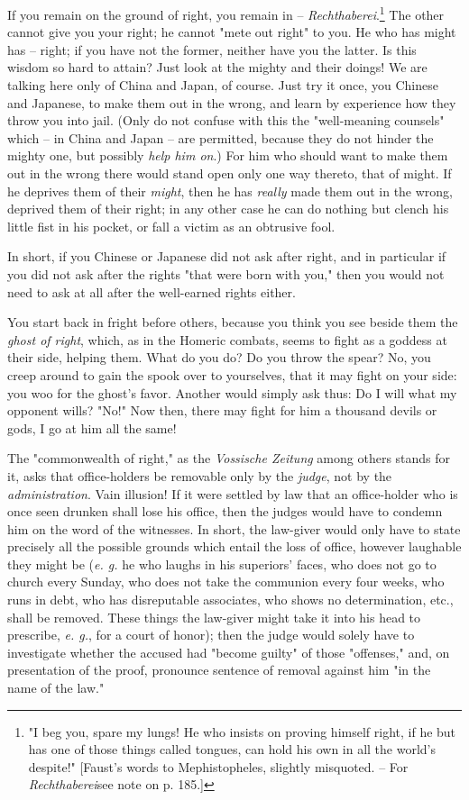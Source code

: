 \documentclass[a4paper]{book}
\begin{document}
If you remain on the ground of right, you remain in -- 
\textit{Rechthaberei}.\footnote{"{}I beg you, spare my lungs! He who insists 
on proving himself right, if he but has one of those things called tongues, 
can hold his own in all the world's despite!"{} [Faust's words to 
Mephistopheles, slightly misquoted. -- For \textit{Rechthaberei}see note on p. 
185.]} The other cannot give you your right; he cannot "{}mete out right"{} to 
you. He who has might has -- right; if you have not the former, neither have 
you the latter. Is this wisdom so hard to attain? Just look at the mighty and 
their doings! We are talking here only of China and Japan, of course. Just try 
it once, you Chinese and Japanese, to make them out in the wrong, and learn by 
experience how they throw you into jail. (Only do not confuse with this the 
"{}well-meaning counsels"{} which -- in China and Japan -- are permitted, 
because they do not hinder the mighty one, but possibly \textit{help him on}.) 
For him who should want to make them out in the wrong there would stand open 
only one way thereto, that of might. If he deprives them of their 
\textit{might}, then he has \textit{really} made them out in the wrong, 
deprived them of their right; in any other case he can do nothing but clench 
his little fist in his pocket, or fall a victim as an obtrusive fool.

In short, if you Chinese or Japanese did not ask after right, and in 
particular if you did not ask after the rights "{}that were born with you,"{} 
then you would not need to ask at all after the well-earned rights either.

You start back in fright before others, because you think you see beside them 
the \textit{ghost of right}, which, as in the Homeric combats, seems to fight 
as a goddess at their side, helping them. What do you do? Do you throw the 
spear? No, you creep around to gain the spook over to yourselves, that it may 
fight on your side: you woo for the ghost's favor. Another would simply ask 
thus: Do I will what my opponent wills? "{}No!"{} Now then, there may fight 
for him a thousand devils or gods, I go at him all the same!

The "{}commonwealth of right,"{} as the \textit{Vossische Zeitung} among 
others stands for it, asks that office-holders be removable only by the 
\textit{judge}, not by the \textit{administration}. Vain illusion! If it were 
settled by law that an office-holder who is once seen drunken shall lose his 
office, then the judges would have to condemn him on the word of the 
witnesses. In short, the law-giver would only have to state precisely all the 
possible grounds which entail the loss of office, however laughable they might 
be (\textit{e. g.} he who laughs in his superiors' faces, who does not go to 
church every Sunday, who does not take the communion every four weeks, who 
runs in debt, who has disreputable associates, who shows no determination, 
etc., shall be removed. These things the law-giver might take it into his head 
to prescribe, \textit{e. g.}, for a court of honor); then the judge would 
solely have to investigate whether the accused had "{}become guilty"{} of 
those "{}offenses,"{} and, on presentation of the proof, pronounce sentence of 
removal against him "{}in the name of the law."{}
\end{document}
